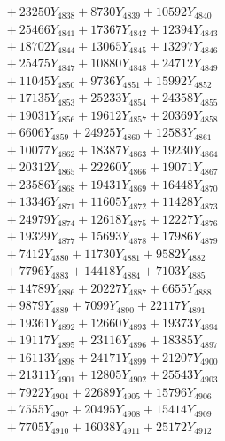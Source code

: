 \documentclass[a4paper,10pt]{article}
\begin{document}
{\begin{align}
&\;  + 23250 Y_{4838} + 8730 Y_{4839} + 10592 Y_{4840} \\[0.3ex]
&\;  + 25466 Y_{4841} + 17367 Y_{4842} + 12394 Y_{4843} \\[0.3ex]
&\;  + 18702 Y_{4844} + 13065 Y_{4845} + 13297 Y_{4846} \\[0.3ex]
&\;  + 25475 Y_{4847} + 10880 Y_{4848} + 24712 Y_{4849} \\[0.3ex]
&\;  + 11045 Y_{4850} + 9736 Y_{4851} + 15992 Y_{4852} \\[0.3ex]
&\;  + 17135 Y_{4853} + 25233 Y_{4854} + 24358 Y_{4855} \\[0.3ex]
&\;  + 19031 Y_{4856} + 19612 Y_{4857} + 20369 Y_{4858} \\[0.5ex]\allowbreak
&\;  + 6606 Y_{4859} + 24925 Y_{4860} + 12583 Y_{4861} \\[0.3ex]
&\;  + 10077 Y_{4862} + 18387 Y_{4863} + 19230 Y_{4864} \\[0.3ex]
&\;  + 20312 Y_{4865} + 22260 Y_{4866} + 19071 Y_{4867} \\[0.3ex]
&\;  + 23586 Y_{4868} + 19431 Y_{4869} + 16448 Y_{4870} \\[0.3ex]
&\;  + 13346 Y_{4871} + 11605 Y_{4872} + 11428 Y_{4873} \\[0.3ex]
&\;  + 24979 Y_{4874} + 12618 Y_{4875} + 12227 Y_{4876} \\[0.3ex]
&\;  + 19329 Y_{4877} + 15693 Y_{4878} + 17986 Y_{4879} \\[0.3ex]
&\;  + 7412 Y_{4880} + 11730 Y_{4881} + 9582 Y_{4882} \\[0.3ex]
&\;  + 7796 Y_{4883} + 14418 Y_{4884} + 7103 Y_{4885} \\[0.3ex]
&\;  + 14789 Y_{4886} + 20227 Y_{4887} + 6655 Y_{4888} \\[0.5ex]\allowbreak
&\;  + 9879 Y_{4889} + 7099 Y_{4890} + 22117 Y_{4891} \\[0.3ex]
&\;  + 19361 Y_{4892} + 12660 Y_{4893} + 19373 Y_{4894} \\[0.3ex]
&\;  + 19117 Y_{4895} + 23116 Y_{4896} + 18385 Y_{4897} \\[0.3ex]
&\;  + 16113 Y_{4898} + 24171 Y_{4899} + 21207 Y_{4900} \\[0.3ex]
&\;  + 21311 Y_{4901} + 12805 Y_{4902} + 25543 Y_{4903} \\[0.3ex]
&\;  + 7922 Y_{4904} + 22689 Y_{4905} + 15796 Y_{4906} \\[0.3ex]
&\;  + 7555 Y_{4907} + 20495 Y_{4908} + 15414 Y_{4909} \\[0.3ex]
&\;  + 7705 Y_{4910} + 16038 Y_{4911} + 25172 Y_{4912} \\[0.3ex]

\end{align}}
\end{document}
